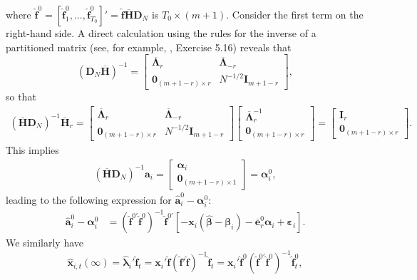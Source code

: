 \documentclass[12pt,fleqn]{article}
\def\*#1{\mathbf{#1}}
\def\+#1{\boldsymbol{#1}}
\begin{document}
where $\widehat{\*f}^0 = [\widehat{\*f}_1^0,...,\widehat{\*f}_{T_0}^0]' = \widehat{\*f}\overline{\*{H}}\*{D}_N$ is $T_0\times (m+1)$. Consider the first term on the right-hand side. A direct calculation using the rules for the inverse of a partitioned matrix (see, for example, \citet{abadir2005matrix}, Exercise 5.16) reveals that
\begin{equation}
    (\*{D}_N\overline{\*{H}})^{-1} =\left[\begin{array}{cc}\overline{\+{\Lambda}}_r & \overline{\+{\Lambda}}_{-r}\\
    \*{0}_{(m+1-r)\times r} & N^{-1/2}\*{I}_{m+1-r}\end{array}\right],
\end{equation}
so that
\begin{align}
(\overline{\*{H}}\*{D}_N)^{-1}\overline{\*H}_{r} = \left[\begin{array}{cc}\overline{\+{\Lambda}}_r & \overline{\+{\Lambda}}_{-r}\\
    \*{0}_{(m+1-r)\times r} & N^{-1/2}\*{I}_{m+1-r}\end{array}\right]\left[\begin{array}{c}\overline{\+{\Lambda}}_r^{-1} \\
    \*{0}_{(m+1-r)\times r} \end{array}\right] = \left[\begin{array}{c} \*I_r \\
    \*{0}_{(m+1-r)\times r} \end{array}\right].
\end{align}
This implies
\begin{align}
(\overline{\*{H}}\*{D}_N)^{-1}\*a_i = \left[\begin{array}{c} \+\alpha_i \\
    \*{0}_{(m+1-r)\times 1} \end{array}\right] = \+\alpha_i^0,
\end{align}
leading to the following expression for $\widehat{\*a}_i^0-\+\alpha_i^0$:
\begin{align}
\widehat{\*a}_i^0 - \+\alpha_i^0 & = (\widehat{\*f}^{0\prime}\widehat{\*f}^0)^{-1}\widehat{\*f}^{0\prime}[- \*x_{i}(\widehat{\+\beta}-\+\beta_i)  - \overline{\*e}_{r}^0\+\alpha_i +  \+\varepsilon_{i} ].
\end{align}
We similarly have
\begin{equation}
\widehat{\*x}_{i,t}(\infty) = \widehat{\+\lambda}_i'\widehat{\*f}_t = \*x_i'\widehat{\*f}( \widehat{\*f}' \widehat{\*f} )^{-1} \widehat{\*f}_t= \*x_i'\widehat{\*f}^0( \widehat{\*f}^{0\prime} \widehat{\*f}^0 )^{-1} \widehat{\*f}_t^0 ,
\end{equation}
\end{document}
